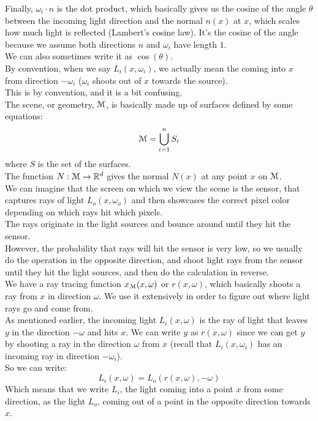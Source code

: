 \documentclass[12pt]{article}
\begin{document}
Finally, $\omega_i \cdot n$ is the dot product,
which basically gives us the cosine of the angle $\theta$
between the incoming light direction and the normal
$n(x)$ at $x$, which scales how much light is reflected
(Lambert's cosine law).
It's the cosine of the angle because we 
assume both directions $n$ and $\omega_i$
have length $1$. \\
We can also sometimes write it as $\cos(\theta)$. \\

By convention, when we say $L_i(x, \omega_i)$,
we actually mean the coming into $x$
from direction $-\omega_i$
($\omega_i$ shoots out of $x$ towards the source). \\
This is by convention, and it is a bit confusing. \\

The scene, or geometry,
$\mathcal{M}$, is basically made up of surfaces defined
by some equations:
\[ \mathcal{M} = \bigcup_{i=1}^{n} S_i \]
where $S$ is the set of the surfaces. \\

The function $N:\mathcal{M} \to \mathbb{R}^d$
gives the normal $N(x)$ at any point $x$ on $\mathcal{M}$. \\

We can imagine that the screen on which we view the
scene is the sensor, that captures rays of light 
$L_o(x, \omega_o)$ and then showcases the correct pixel
color depending on which rays hit which pixels. \\
The rays originate in the light sources and bounce around
until they hit the sensor. \\
However, the probability that rays will hit the sensor
is very low, so we usually do the operation in the
opposite direction, and shoot light rays from the sensor
until they hit the light sources,
and then do the calculation in reverse. \\

We have a ray tracing function $x_{\mathcal{M}}(x, \omega)$
or $r(x, \omega)$, which basically shoots a ray
from $x$ in direction $\omega$. We use it extensively
in order to figure out where light rays go and come from. \\

As mentioned earlier, the incoming light $L_i(x, \omega)$
is the ray of light that leaves $y$ in the direction $-\omega$
and hits $x$.
We can write $y$ as $r(x,\omega)$
since we can get $y$ by shooting a ray in the direction
$\omega$ from $x$ (recall that $L_i(x, \omega_i)$
has an incoming ray in direction $-\omega_i$). \\
So we can write:
\[ L_i(x, \omega) = L_o(r(x, \omega), -\omega) \]
Which means that we write $L_i$,
the light coming into a point $x$ from some direction,
as the light $L_o$, coming out of a point in
the opposite direction towards $x$. \\
\end{document}
